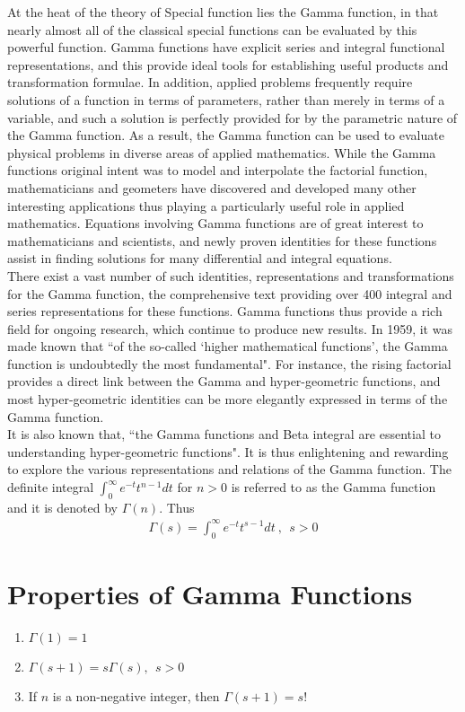 \documentclass[11pt]{report}
\newcommand{\dsp}{\displaystyle}
\begin{document}
	At the heat of the theory of Special function lies the Gamma function, in that nearly almost all of the classical special functions can be evaluated by this powerful function. Gamma functions have explicit series and integral functional representations, and this provide ideal tools for establishing useful products and transformation formulae. In addition, applied problems frequently require solutions of a function in terms of parameters, rather than merely in terms of a variable, and such a solution is perfectly provided for by the parametric nature of the Gamma function. As a result, the Gamma function can be used to evaluate physical problems in diverse areas of applied mathematics. While the Gamma functions original intent was to model and interpolate the factorial function, mathematicians and geometers have discovered and developed many other interesting applications thus playing a particularly useful role in applied mathematics. Equations involving Gamma functions are of great interest to mathematicians and scientists, and newly proven identities for these functions assist in finding solutions for many differential and integral equations.\\
	
	There exist a vast number of such identities, representations and transformations for the Gamma function, the comprehensive text providing over 400 integral and series representations for these functions. Gamma functions thus provide a rich field for ongoing research, which continue to produce new results. In 1959, it was made known that ``of the so-called `higher mathematical functions', the Gamma function is undoubtedly the most fundamental". For instance, the rising factorial provides a direct link between the Gamma and hyper-geometric functions, and most hyper-geometric identities can be more elegantly expressed in terms of the Gamma function.\\
	
	It is also known that, ``the Gamma functions and Beta integral are essential to understanding hyper-geometric functions". It is thus enlightening and rewarding to explore the various representations and relations of the Gamma function. The definite integral $\dsp\int_0^\infty e^{-t}t^{n-1}dt$ for $n>0$ is referred to as the Gamma function and it is denoted by $\dsp \Gamma(n)$. Thus
	\begin{eqnarray}
		\Gamma(s) = \int_0^\infty e^{-t}t^{s-1}dt~,~~ s>0\label{eq:3_1}
	\end{eqnarray}
	
	\section{Properties of Gamma Functions}
	\begin{enumerate}
		\item $\dsp \Gamma(1) = 1$
		\item $\dsp\Gamma(s+1) = s\Gamma(s), ~~ s>0$
		\item If $n$ is a non-negative integer, then $\dsp\Gamma(s+1)=s!$
	\end{enumerate}
\end{document}
